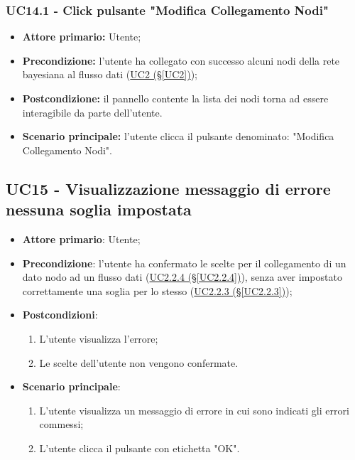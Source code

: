 \subsubsection{UC14.1 - Click pulsante "Modifica Collegamento Nodi"}\label{UC14.1}
\begin{itemize}
\item \textbf{Attore primario:} Utente;
\item \textbf{Precondizione:} l'utente ha collegato con successo alcuni nodi della rete bayesiana al flusso dati 			(\hyperref[UC2]{UC2 (§\ref*{UC2})});
\item \textbf{Postcondizione:} il pannello contente la lista dei nodi torna ad essere interagibile da parte dell'utente.
\item \textbf{Scenario principale:} l'utente clicca il pulsante denominato: "Modifica Collegamento Nodi".
\end{itemize}
\newpage

\subsection{UC15 - Visualizzazione messaggio di errore nessuna soglia impostata}\label{UC15}
\begin{itemize}
\item \textbf{Attore primario}: Utente;
\item \textbf{Precondizione}: l'utente ha confermato le scelte per il collegamento di un dato nodo ad un flusso 				dati (\hyperref[UC2.2.4]{UC2.2.4 (§\ref*{UC2.2.4})}), senza aver impostato correttamente una soglia per lo stesso 	(\hyperref[UC2.2.3]{UC2.2.3 (§\ref*{UC2.2.3})});
\item \textbf{Postcondizioni}: 
	\begin{enumerate}
	\item L'utente visualizza l'errore;
	\item Le scelte dell'utente non vengono confermate.
	\end{enumerate}
\item \textbf{Scenario principale}: 
	\begin{enumerate}
	\item L'utente visualizza un messaggio di errore in cui sono indicati gli errori commessi;
	\item L'utente clicca il pulsante con etichetta "OK".
	\end{enumerate}
\end{itemize}

\pagebreak


